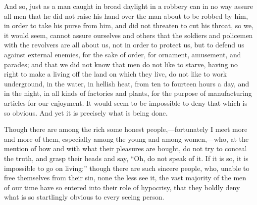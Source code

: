 \documentclass{book}
\begin{document}
And so, just as a man caught in broad daylight in a robbery can in no way assure all men that he did not raise his hand over the man about to be robbed by him, in order to take his purse from him, and did not threaten to cut his throat, so we, it would seem, cannot assure ourselves and others that the soldiers and policemen with the revolvers are all about us, not in order to protect us, but to defend us against external enemies, for the sake of order, for ornament, amusement, and parades; and that we did not know that men do not like to starve, having no right to make a living off the land on which they live, do not like to work underground, in the water, in hellish heat, from ten to fourteen hours a day, and in the night, in all kinds of factories and plants, for the purpose of manufacturing articles for our enjoyment. It would seem to be impossible to deny that which is so obvious. And yet it is precisely what is being done.

Though there are among the rich some honest people,—fortunately I meet more and more of them, especially among the young and among women,—who, at the mention of how and with what their pleasures are bought, do not try to conceal the truth, and grasp their heads and say, “Oh, do not speak of it. If it is so, it is impossible to go on living;” though there are such sincere people, who, unable to free themselves from their sin, none the less see it, the vast majority of the men of our time have so entered into their role of hypocrisy, that they boldly deny what is so startlingly obvious to every seeing person.
\end{document}
